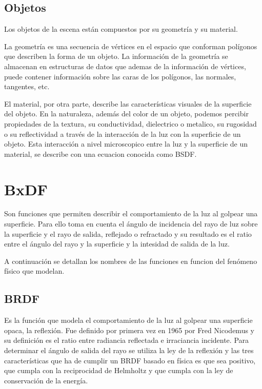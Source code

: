     \subsection{Objetos}
        Los objetos de la escena est\'an compuestos por su geometr\'ia y su material.

        La geometr\'ia es una secuencia de v\'ertices en el espacio que conforman pol\'igonos que describen la forma de un objeto. La informaci\'on de la
        geometr\'ia se almacenan en estructuras de datos que ademas de la informaci\'on de v\'ertices, puede contener informaci\'on sobre las caras de los
        pol\'igonos, las normales, tangentes, etc.

        El material, por otra parte, describe las caracter\'isticas visuales de la superficie del objeto. En la naturaleza, adem\'as del color de un objeto,
        podemos percibir propiedades de la textura, su conductividad, dielectrico o metalico, su rugosidad o su reflectividad a trav\'es de la interacci\'on
        de la luz con la superficie de un objeto. Esta interacci\'on a nivel microscopico entre la luz y la superficie de un material, se describe con una
        ecuacion conocida como BSDF.


\section{BxDF}
    Son funciones que permiten describir el comportamiento de la luz al golpear una superficie. Para ello toma en cuenta el \'angulo de incidencia del
    rayo de luz sobre la superficie y el rayo de salida, reflejado o refractado y su resultado es el ratio entre el \'angulo del rayo y la superficie y
    la intesidad de salida de la luz.

    A continuaci\'on se detallan los nombres de las funciones en funcion del fen\'omeno f\'isico que modelan.

    \subsection{BRDF}
        Es la funci\'on que modela el comportamiento de la luz al golpear una superficie opaca, la reflexi\'on. Fue definido por primera vez en 1965 por
        Fred Nicodemus y su definici\'on es el ratio entre radiancia reflectada e irraciancia incidente.
        Para determinar el \'angulo de salida del rayo se utiliza la ley de la reflexi\'on y las tres caracter\'isticas que ha de cumplir un BRDF basado en
        f\'isica es que sea positivo, que cumpla con la reciprocidad de Helmholtz y que cumpla con la ley de conservaci\'on de la energ\'ia.

